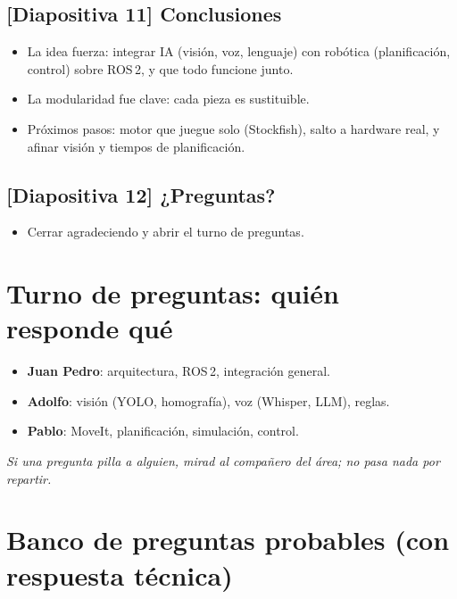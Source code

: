 \documentclass[11pt]{article}
\newcommand{\slide}[1]{\textbf{\color{azul}[Diapositiva #1]}}
\begin{document}
\subsection{\slide{11} Conclusiones}
\begin{itemize}
    \item La idea fuerza: integrar IA (visión, voz, lenguaje) con robótica
          (planificación, control) sobre ROS\,2, y que todo funcione junto.
    \item La modularidad fue clave: cada pieza es sustituible.
    \item Próximos pasos: motor que juegue solo (Stockfish), salto a hardware
          real, y afinar visión y tiempos de planificación.
\end{itemize}

\subsection{\slide{12} ¿Preguntas?}
\begin{itemize}
    \item Cerrar agradeciendo y abrir el turno de preguntas.
\end{itemize}

\bigskip
\section*{Turno de preguntas: quién responde qué}
\begin{itemize}
    \item \textbf{Juan Pedro}: arquitectura, ROS\,2, integración general.
    \item \textbf{Adolfo}: visión (YOLO, homografía), voz (Whisper, LLM), reglas.
    \item \textbf{Pablo}: MoveIt, planificación, simulación, control.
\end{itemize}

\noindent
\textit{Si una pregunta pilla a alguien, mirad al compañero del área; no pasa
nada por repartir.}

\newpage
\section*{Banco de preguntas probables (con respuesta técnica)}
\end{document}
